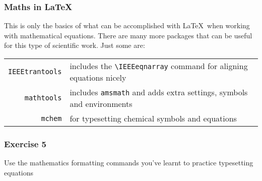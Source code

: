 \documentclass[mathserif]{beamer}
\begin{document}
\begin{frame}[fragile]
\frametitle{Maths in \LaTeX}
\vfill
This is only the basics of what can be accomplished with \LaTeX\ when working with mathematical equations.
\vfill
There are many more packages that can be useful for this type of scientific work. Just some are:
\vfill
\begin{center}
\begin{tabular}{r | p{} | }
	\texttt{IEEEtrantools} & includes the \texttt{{\textbackslash}IEEEeqnarray} command for aligning equations nicely\\
	\texttt{mathtools} & includes \texttt{amsmath} and adds extra settings, symbols and environments \\		
	\texttt{mchem} & for typesetting chemical symbols and equations \\		
\end{tabular}
\end{center}
\vfill
\end{frame}


\begin{frame}
\frametitle{Exercise 5}

\begin{center}
\vfill
Use the mathematics formatting commands you've learnt to practice typesetting equations
\vfill
\end{center}
\end{frame}
\end{document}
